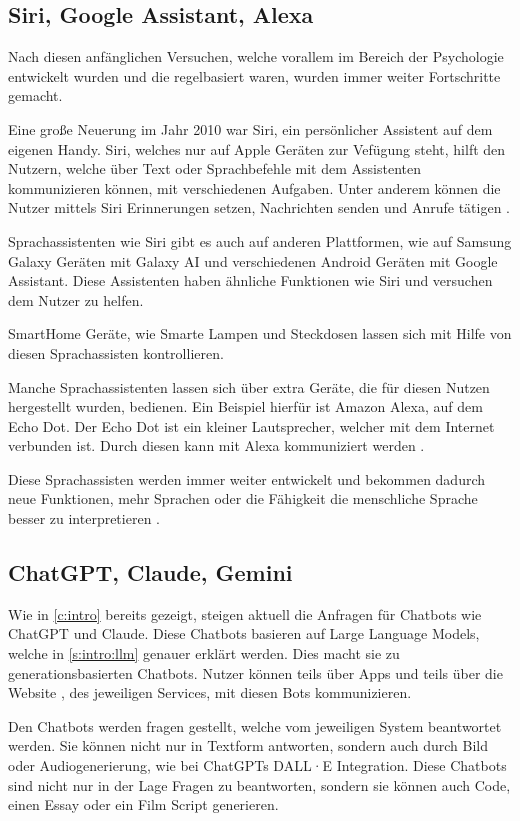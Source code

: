 \subsection{Siri, Google Assistant, Alexa}
Nach diesen anfänglichen Versuchen, welche vorallem im Bereich der 
Psychologie entwickelt wurden und die regelbasiert waren, wurden immer weiter Fortschritte gemacht.\par
Eine große Neuerung im Jahr 2010 war Siri, ein persönlicher Assistent auf dem eigenen Handy.
Siri, welches nur auf Apple Geräten zur Vefügung steht, hilft den Nutzern, welche 
über Text oder Sprachbefehle mit dem Assistenten kommunizieren können, mit verschiedenen Aufgaben.
Unter anderem können die Nutzer mittels Siri Erinnerungen setzen, Nachrichten senden
und Anrufe tätigen \cite{Siri}. \par
Sprachassistenten wie Siri gibt es auch auf anderen Plattformen, wie auf Samsung Galaxy Geräten mit Galaxy AI 
und verschiedenen Android Geräten mit Google Assistant. Diese Assistenten haben ähnliche Funktionen wie 
Siri und versuchen dem Nutzer zu helfen\cite{GoogleAssistantYour,GalaxyAISamsung}.\par
SmartHome Geräte, wie Smarte Lampen und Steckdosen lassen sich mit Hilfe von diesen 
Sprachassisten kontrollieren.\par
Manche Sprachassistenten lassen sich über extra Geräte, die für diesen Nutzen hergestellt wurden, bedienen. 
Ein Beispiel hierfür ist Amazon Alexa, auf dem Echo Dot.
Der Echo Dot ist ein kleiner Lautsprecher, welcher mit dem Internet verbunden ist. 
Durch diesen kann mit Alexa kommuniziert werden \cite{2022EchoDot}.\par
Diese Sprachassisten werden immer weiter entwickelt und bekommen dadurch neue Funktionen, 
mehr Sprachen oder die Fähigkeit die menschliche Sprache besser zu interpretieren \cite{Siri}. 

\subsection{ChatGPT, Claude, Gemini}
Wie in \ref*{c:intro} bereits gezeigt, steigen aktuell die Anfragen für 
Chatbots wie ChatGPT und Claude.
Diese Chatbots basieren auf Large Language Models, welche in \ref{s:intro:llm}
genauer erklärt werden. Dies macht sie zu generationsbasierten Chatbots. 
Nutzer können teils über Apps \cite{ChatGPT2024} und teils über 
die Website \cite{Claude}, des jeweiligen Services, mit diesen Bots kommunizieren.\par
Den Chatbots werden fragen gestellt, welche vom jeweiligen System beantwortet werden.
Sie können nicht nur in Textform antworten, sondern auch durch Bild oder Audiogenerierung, 
wie bei ChatGPTs DALL·E Integration.
Diese Chatbots sind nicht nur in der Lage Fragen zu beantworten, sondern sie können auch Code, 
einen Essay oder ein Film Script generieren.\par


